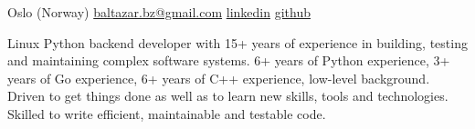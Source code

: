 \documentclass[unicode, 10pt, a4paper, oneside, fleqn]{article}
\begin{document}
\sloppy  %


\nobreakvspace{0.3em}  %

Oslo (Norway)
\sbull
\href{mailto:baltazar.bz@gmail.com}{baltazar.bz\mbox{}@\mbox{}gmail.com}\sbull
\href{http://linkedin.com/pub/yuri-bochkarev/21/3a9/555}{linkedin}
\sbull
\href{https://github.com/balta2ar}{github}



\noindent
Linux Python backend developer with 15+ years of experience in
    building, testing and maintaining complex software systems. 6+ years of
    Python experience, 3+ years of Go experience, 6+ years of C++ experience,
    low-level background. Driven to get things done as well as to learn new
    skills, tools and technologies. Skilled to write efficient, maintainable and
    testable code.



\end{document}
